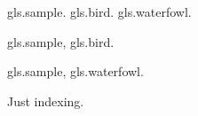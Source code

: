 \documentclass{article}
\begin{document}
\gls{gls.sample}. \gls{gls.bird}. \gls{gls.waterfowl}.

\newpage

\gls{gls.sample}, \gls{gls.bird}.

\newpage

\gls{gls.sample}, \gls{gls.waterfowl}.

\newpage

Just indexing.

\newpage

\printunsrtglossaries
\end{document}
